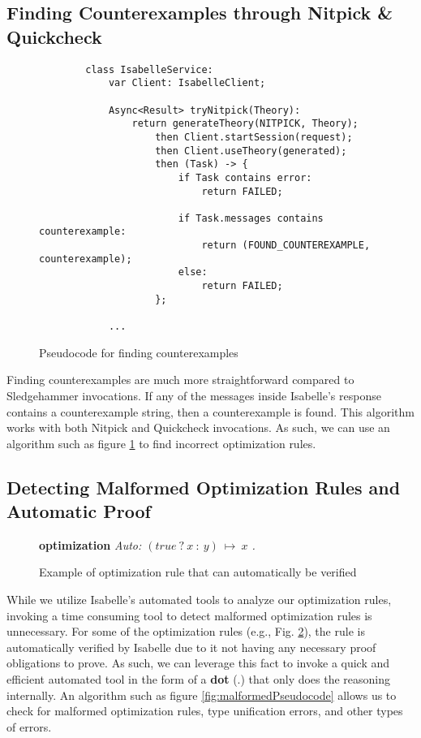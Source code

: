 \subsection{Finding Counterexamples through Nitpick \& Quickcheck}

\begin{figure}[!htb]
    \begin{lstlisting}
        class IsabelleService:
            var Client: IsabelleClient;
            
            Async<Result> tryNitpick(Theory):
                return generateTheory(NITPICK, Theory);
                    then Client.startSession(request);
                    then Client.useTheory(generated);
                    then (Task) -> {
                        if Task contains error:
                            return FAILED;

                        if Task.messages contains counterexample:
                            return (FOUND_COUNTEREXAMPLE, counterexample);
                        else:
                            return FAILED;
                    };
            
            ...
    \end{lstlisting}

    \caption{Pseudocode for finding counterexamples}
    \label{fig:counterexamplePseudocode}
\end{figure}

Finding counterexamples are much more straightforward compared to Sledgehammer invocations. If any of the messages inside Isabelle's response 
contains a counterexample string, then a counterexample is found. This algorithm works with both Nitpick and Quickcheck invocations. As such, 
we can use an algorithm such as figure \ref{fig:counterexamplePseudocode} to find incorrect optimization rules.

\subsection{Detecting Malformed Optimization Rules and Automatic Proof}

\begin{figure}[!htb]
    \centering
    \textbf{optimization} \emph{Auto: \((true~?~x~:~y)\ \longmapsto\ x\) .}

    \caption{Example of optimization rule that can automatically be verified}
    \label{fig:AutoExample}
\end{figure}

While we utilize Isabelle's automated tools to analyze our optimization rules, invoking a time consuming tool to detect malformed optimization rules 
is unnecessary. For some of the optimization rules (e.g., Fig. \ref{fig:AutoExample}), the rule is automatically verified by Isabelle due to it not 
having any necessary proof obligations to prove. As such, we can leverage this fact to invoke a quick and efficient automated tool in the form of a 
\textbf{dot} (.) that only does the reasoning internally. An algorithm such as figure \ref{fig:malformedPseudocode} allows us to check for malformed 
optimization rules, type unification errors, and other types of errors.


